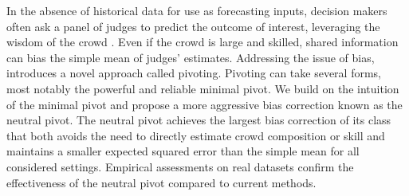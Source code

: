 In the absence of historical data for use as forecasting inputs, decision makers often ask a panel of judges to predict the outcome of interest, leveraging the wisdom of the crowd \citep{woc}. Even if the crowd is large and skilled, shared information can bias the simple mean of judges’ estimates. Addressing the issue of bias, \cite{mp} introduces a novel approach called pivoting. Pivoting can take several forms, most notably the powerful and reliable minimal pivot. We build on the intuition of the minimal pivot and propose a more aggressive bias correction known as the neutral pivot. The neutral pivot achieves the largest bias correction of its class that both avoids the need to directly estimate crowd composition or skill and maintains a smaller expected squared error than the simple mean for all considered settings. Empirical assessments on real datasets confirm the effectiveness of the neutral pivot compared to current methods.